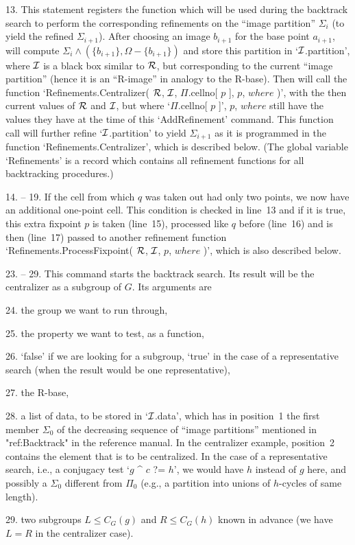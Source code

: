 \item{13.}
This statement registers the function  which  will  be  used  during  the
backtrack search to perform the corresponding refinements on the  ``image
partition'' $\Sigma_i$  (to  yield  the  refined  $\Sigma_{i+1}$).  After
choosing an image $b_{i+1}$ for the base  point  $a_{i+1}$,  {\GAP}  will
compute $\Sigma_i \wedge (\{b_{i+1}\},\Omega-\{b_{i+1}\})$ and store this
partition in `${\cal I}$.partition', where ${\cal I}$ is a black box similar to ${\cal R}$,
but corresponding to the current ``image  partition''  (hence  it  is  an
``R-image'' in analogy to the R-base). Then {\GAP} will call the function
`Refinements.Centralizer( ${\cal R}$, ${\cal I}$, $\Pi$.cellno[ $p$ ],  $p$,  $where$
)',  with  the  then  current  values  of  ${\cal R}$  and  ${\cal I}$,   but   where
`$\Pi$.cellno[ $p$ ]', $p$, $where$ still have the values  they  have  at
the time of this `AddRefinement' command. This function call will further
refine `${\cal I}$.partition' to yield $\Sigma_{i+1}$ as it  is  programmed  in
the function `Refinements.Centralizer', which is  described  below.  (The
global variable `Refinements' is a record which contains  all  refinement
functions for all backtracking procedures.)

\item{14.} -- 19.
If the cell from which $q$ was taken out had only two points, we now have
an additional one-point cell. This condition is checked in line~13 and if
it is true, this extra fixpoint $p$ is taken  (line~15),  processed  like
$q$ before (line~16) and is then (line~17) passed to  another  refinement
function `Refinements.ProcessFixpoint( ${\cal R}$, ${\cal I}$, $p$, $where$ )', which
is also described below.

\endlist
\beginlist%

\item{23.} -- 29.
This command  starts  the  backtrack  search.  Its  result  will  be  the
centralizer as a subgroup of $G$. Its arguments are

\endlist
\beginlist%
  \item{24.} the group we want to run through,
  \item{25.} the property we want to test, as a {\GAP} function,
  \item{26.} `false' if we are looking for a subgroup, `true' in the case
    of   a  representative  search    (when  the result   would    be one
    representative),
  \item{27.} the R-base,
  \item{28.} a list  of data, to be stored  in `${\cal I}$.data', which has
    in position~1 the first member $\Sigma_0$  of the decreasing sequence
    of ``image partitions'' mentioned in "ref:Backtrack" in the
    reference manual. In the centralizer example, position~2 contains the
    element that is  to be centralized. In the  case of  a representative
    search,  i.e.,  a conjugacy test  `$g$  ^ $c$ ?= $h$', we
    would  have $h$   instead of  $g$   here, and   possibly a $\Sigma_0$
    different from $\Pi_0$ (e.g., a  partition into unions of  $h$-cycles
    of same length).
  \item{29.} two subgroups  $L\le  C_G(g)$  and  $R\le  C_G(h)$ known  in
    advance (we have $L=R$ in the centralizer case).
\endlist

